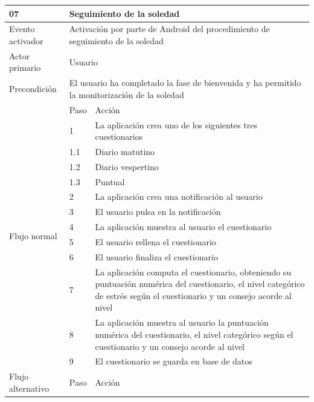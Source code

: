     \begin{table}[h]
        \centering
        \begin{tabularx}{\textwidth}{|l|l|X|}
            \hline
            07 & \multicolumn{2}{|X|}{Seguimiento de la soledad} \\
            \hline
            Evento activador & \multicolumn{2}{|X|}{Activación por parte de Android del procedimiento de seguimiento de la soledad} \\
            \hline
            Actor primario & \multicolumn{2}{|X|}{Usuario} \\
            \hline
            Precondición & \multicolumn{2}{|X|}{El usuario ha completado la fase de bienvenida y ha permitido la monitorización de la soledad} \\
            \hline
            \multirow{13}{*}{Flujo normal} & Paso & Acción \\
            \cline{2-3} & 1 & La aplicación crea uno de los siguientes tres cuestionarios \\
            \cline{2-3} & 1.1 & Diario matutino \\
            \cline{2-3} & 1.2 & Diario vespertino \\
            \cline{2-3} & 1.3 & Puntual \\
            \cline{2-3} & 2 & La aplicación crea una notificación al usuario \\
            \cline{2-3} & 3 & El usuario pulsa en la notificación \\
            \cline{2-3} & 4 & La aplicación muestra al usuario el cuestionario \\
            \cline{2-3} & 5 & El usuario rellena el cuestionario \\
            \cline{2-3} & 6 & El usuario finaliza el cuestionario \\
            \cline{2-3} & 7 & La aplicación computa el cuestionario, obteniendo su puntuación numérica del cuestionario, el nivel categórico de estrés según el cuestionario y un consejo acorde al nivel \\
            \cline{2-3} & 8 & La aplicación muestra al usuario la puntuación numérica del cuestionario, el nivel categórico según el cuestionario y un consejo acorde al nivel \\
            \cline{2-3} & 9 & El cuestionario se guarda en base de datos \\
            \hline
            \multirow{6}{*}{Flujo alternativo} & Paso & Acción \\

\end{tabularx}
\end{table}
